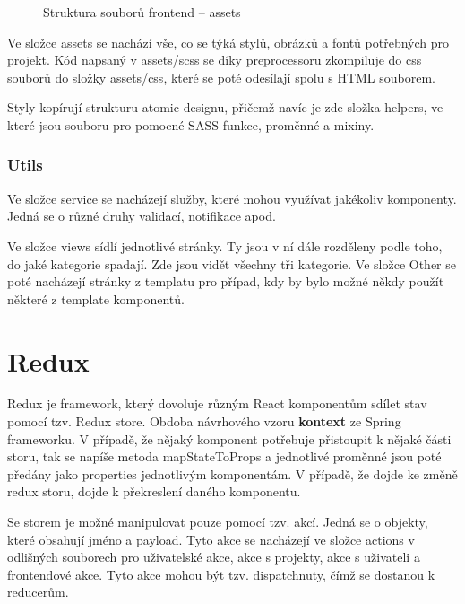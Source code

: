 \documentclass[a4paper,oneside,12pt]{report}
\begin{document}
\begin{figure}[H]
   \caption[Struktura souborů frontendu -- assets]{Struktura souborů frontend -- assets}
   \label{fig:frontendStructureAssets}
\end{figure}
Ve složce assets se nachází vše, co se týká stylů, obrázků a fontů potřebných pro projekt.
Kód napsaný v assets/scss se díky preprocessoru zkompiluje do css souborů do složky assets/css, které se poté odesílají spolu s HTML souborem.

Styly kopírují strukturu atomic designu, přičemž navíc je zde složka helpers, ve které jsou souboru pro pomocné SASS funkce, proměnné a mixiny.

\subsubsection{Utils}
Ve složce service se nacházejí služby, které mohou využívat jakékoliv komponenty.
Jedná se o různé druhy validací, notifikace apod.

Ve složce views sídlí jednotlivé stránky.
Ty jsou v ní dále rozděleny podle toho, do jaké kategorie spadají.
Zde jsou vidět všechny tři kategorie.
Ve složce Other se poté nacházejí stránky z templatu pro případ, kdy by bylo možné někdy použít některé z template komponentů.

\section{Redux}

Redux je framework, který dovoluje různým React komponentům sdílet stav pomocí tzv. Redux store. Obdoba návrhového vzoru \textbf{kontext} ze Spring frameworku.
V případě, že nějaký komponent potřebuje přistoupit k nějaké části storu, tak se napíše metoda mapStateToProps a jednotlivé proměnné jsou poté předány jako properties jednotlivým komponentám.
V případě, že dojde ke změně redux storu, dojde k překreslení daného komponentu.

Se storem je možné manipulovat pouze pomocí tzv. akcí.
Jedná se o objekty, které obsahují jméno a payload.
Tyto akce se nacházejí ve složce actions v odlišných souborech pro uživatelské akce, akce s projekty, akce s uživateli a frontendové akce.
Tyto akce mohou být tzv. dispatchnuty, čímž se dostanou k reducerům.
\end{document}
